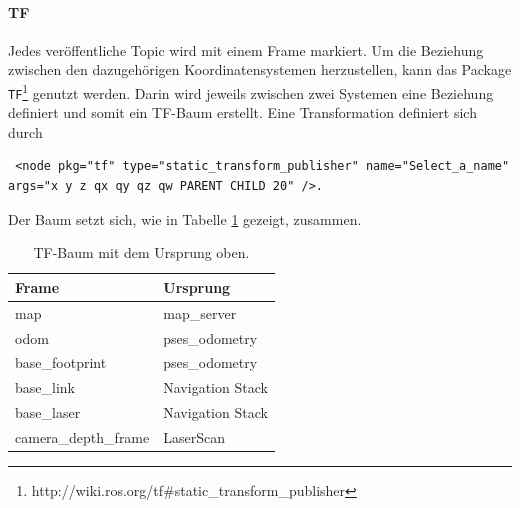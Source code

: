 \paragraph{TF}
Jedes ver\"offentliche Topic wird mit einem Frame markiert. Um die Beziehung zwischen den dazugeh\"origen Koordinatensystemen herzustellen, kann das Package \texttt{TF}\footnote{http://wiki.ros.org/tf\#static\_transform\_publisher} genutzt werden. Darin wird jeweils zwischen zwei Systemen eine Beziehung definiert und somit ein TF-Baum erstellt. Eine Transformation definiert sich durch
\lstset{breaklines=true, basicstyle=\small}
\begin{lstlisting}
 <node pkg="tf" type="static_transform_publisher" name="Select_a_name" args="x y z qx qy qz qw PARENT CHILD 20" />.
\end{lstlisting}
Der Baum setzt sich, wie in Tabelle \ref{tab:TF} gezeigt, zusammen.
\begin{table}[h]
	\centering
	\renewcommand{\arraystretch}{1.2}
	\begin{tabular}{ll}
		Frame & Ursprung  \\ \hline
		map & map\_server \\
		odom & pses\_odometry \\
		base\_footprint & pses\_odometry \\
		base\_link & Navigation Stack \\
		base\_laser & Navigation Stack \\
		camera\_depth\_frame & LaserScan
	\end{tabular}
	\caption{TF-Baum mit dem Ursprung oben.}
	\label{tab:TF}
\end{table}

